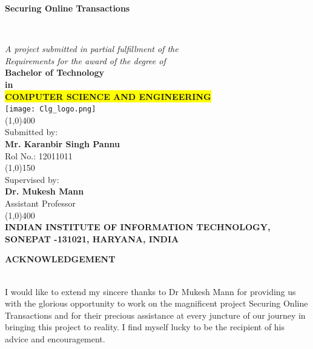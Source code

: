 \documentclass[12pt, oneside, a4paper]{article}
\begin{document}
\begin{center}
    \vspace{0.1cm}
    \begin{Large}\textbf{Securing Online Transactions}\end{Large}\\
    \vspace{0.8cm}\begin{large}
    \textit{A project submitted in partial fulfillment of the\\
    Requirements for the award of the degree of}\\
    \vspace{0.8cm}
    \textbf{Bachelor of Technology\\ in}\\
    \textbf{\colorbox{yellow}{COMPUTER SCIENCE AND ENGINEERING}}\\
    \vspace{1cm}
    \texttt{[image: Clg\_logo.png]}\\
    \vspace{0.8cm}
    \line(1,0){400}\\\vspace{0.3cm}
    Submitted by:\\
    \textbf{Mr. Karanbir Singh Pannu}\\Rol No.: 12011011\\
    \vspace{0.5cm}
    \line(1,0){150}\\
    \vspace{0.5cm}
    Supervised by:\\
    \textbf{Dr. Mukesh Mann}\\
    Assistant Professor\\
    \line(1,0){400}\\
    \vspace{2cm}
    \textbf{INDIAN INSTITUTE OF INFORMATION TECHNOLOGY,\\
    SONEPAT -131021, HARYANA, INDIA}\\\end{large}
\end{center}
\thispagestyle{empty}
\pagebreak
\begin{center}
    \begin{Large}\textbf{ACKNOWLEDGEMENT}\end{Large}
\end{center}\\
\vspace{1cm}
I would like to extend my sincere thanks to Dr Mukesh Mann for providing us with the glorious opportunity to work on the magnificent project Securing Online Transactions and for their precious assistance at every juncture of our journey in bringing this project to reality. I find myself lucky to be the recipient of his advice and encouragement.
\end{document}
